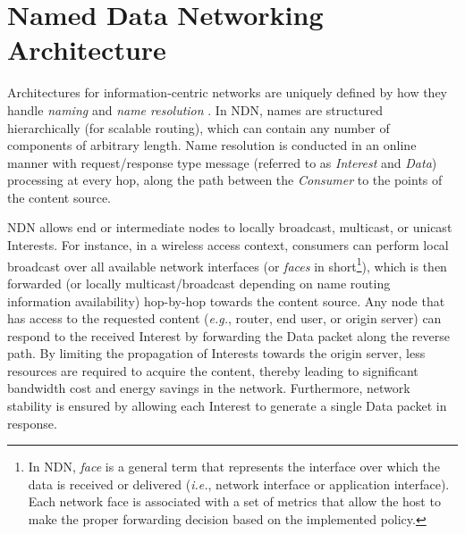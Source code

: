 \documentclass[conference]{IEEEtran}
\begin{document}
\section{Named Data Networking Architecture}\label{Section:NDN}

Architectures for information-centric networks are uniquely defined by how they handle \emph{naming} and \emph{name resolution} \cite{ICNsurvey12}. In NDN, names are structured hierarchically (for scalable routing), which can contain any number of components of arbitrary length. Name resolution is conducted in an online manner with request/response type message (referred to as \emph{Interest} and \emph{Data}) processing at every hop, along the path between the \emph{Consumer} to the points of the content source.

NDN allows end or intermediate nodes to locally broadcast, multicast, or unicast Interests. For instance, in a wireless access context, consumers can perform local broadcast over all available network interfaces (or \emph{faces} in short\footnote{In NDN, \emph{face} is a general term that represents the interface over which the data is received or delivered (\emph{i.e.}, network interface or application interface). Each network face is associated with a set of metrics that allow the host to make the proper forwarding decision based on the implemented policy.}), which is then forwarded (or locally multicast/broadcast depending on name routing information availability) hop-by-hop towards the content source. Any node that has access to the requested content (\emph{e.g.}, router, end user, or origin server) can respond to the received Interest by forwarding the Data packet along the reverse path. By limiting the propagation of Interests towards the origin server, less resources are required to acquire the content, thereby leading to significant bandwidth cost and energy savings in the network. Furthermore, network stability is ensured by allowing each Interest to generate a single Data packet in response.
\end{document}
